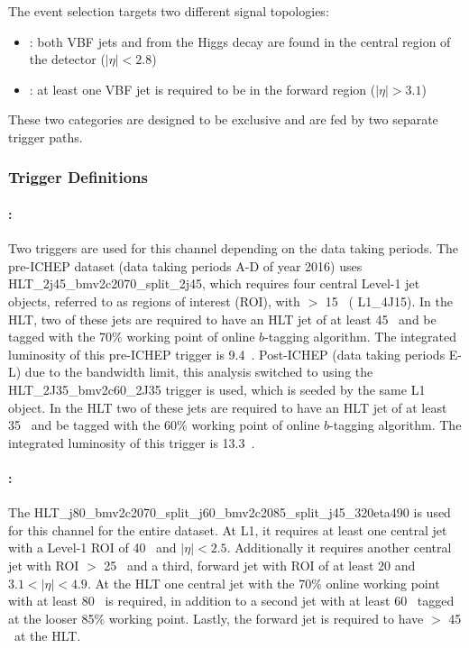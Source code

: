 \label{sec:vbf-evtsel}

The event selection targets two different signal topologies:
\begin{itemize}
\item \fourcentral: both VBF jets and \bjets from the Higgs decay are 
  found in the central region of the detector ($|\eta|<2.8$)
\item \twocentral: at least one VBF jet is required to be
  in the forward region ($|\eta|>3.1$)
\end{itemize}

These two categories are designed to be exclusive and are fed by two separate trigger paths.  

\subsubsection{Trigger Definitions}

\paragraph{\fourcentral:} Two triggers are used for this channel depending on the data taking periods. The pre-ICHEP dataset (data taking periods A-D of year 2016) uses HLT\_2j45\_bmv2c2070\_split\_2j45, which requires four central Level-1 jet objects, referred to as regions of interest (ROI),  with \ET $>$ 15 \GeV~( L1\_4J15).  In the HLT, two of these jets are required to have an HLT jet \ET of at least 45 \GeV~and be tagged with the 70\% working point of online $b$-tagging algorithm. The integrated luminosity of this pre-ICHEP trigger is 9.4~\ifb. Post-ICHEP (data taking periods E-L) due to the bandwidth limit, this analysis switched to using the HLT\_2J35\_bmv2c60\_2J35 trigger is used, which is seeded by the same L1 object.  In the HLT two of these jets are required to have an HLT jet \ET of at least 35 \GeV~and be tagged with the 60\% working point of online $b$-tagging algorithm. The integrated luminosity of this trigger is 13.3~\ifb.

\paragraph{\twocentral:} The HLT\_j80\_bmv2c2070\_split\_j60\_bmv2c2085\_split\_j45\_320eta490 is used for this channel for the entire dataset.  At L1, it requires at least one central jet with a Level-1 ROI \ET of 40 \GeV~and $|\eta| < 2.5$.  Additionally it requires another central jet with ROI \ET $>$ 25 \GeV~and a third, forward jet with ROI \ET of at least 20 and  $3.1 < |\eta| < 4.9$.   At the HLT one central jet \btagged  with the 70\% online working point with at least 80 \GeV~is required, in addition to a second jet with at least 60 \GeV~tagged at the looser 85\% working point. Lastly, the forward jet is required to have \ET $>$ 45 \GeV~at the HLT.


